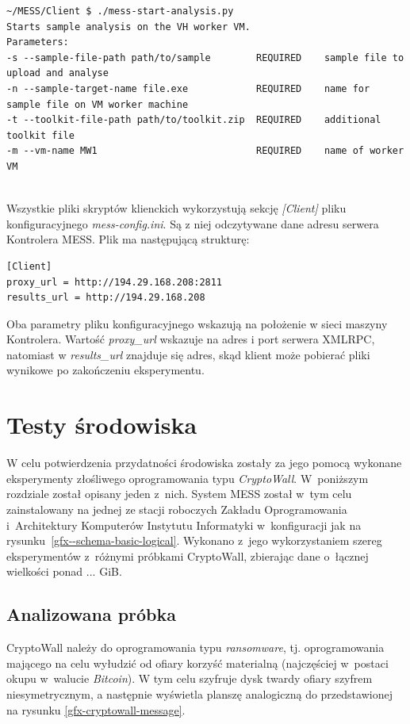 \documentclass[a4paper,12pt,oneside]{article}
\begin{document}
	{\tiny 
	\begin{lstlisting}
~/MESS/Client $ ./mess-start-analysis.py   
Starts sample analysis on the VH worker VM.
Parameters:
-s --sample-file-path path/to/sample        REQUIRED    sample file to upload and analyse
-n --sample-target-name file.exe            REQUIRED    name for sample file on VM worker machine
-t --toolkit-file-path path/to/toolkit.zip  REQUIRED    additional toolkit file
-m --vm-name MW1                            REQUIRED    name of worker VM
		
	\end{lstlisting}
	}
	
	Wszystkie pliki skryptów klienckich wykorzystują sekcję \textit{[Client]} pliku konfiguracyjnego \textit{mess-config.ini}. Są z niej odczytywane dane adresu serwera Kontrolera MESS. Plik ma następującą strukturę:
	
	\begin{lstlisting}
[Client]
proxy_url = http://194.29.168.208:2811
results_url = http://194.29.168.208	
	\end{lstlisting}

	Oba parametry pliku konfiguracyjnego wskazują na położenie w sieci maszyny Kontrolera. Wartość \textit{proxy\_url} wskazuje na adres i port serwera XMLRPC, natomiast w \textit{results\_url} znajduje się adres, skąd klient może pobierać pliki wynikowe po zakończeniu eksperymentu.
	
	\clearpage
	\newpage	
			
	\section{Testy środowiska}
	
	W celu potwierdzenia przydatności środowiska zostały za jego pomocą wykonane eksperymenty złośliwego oprogramowania typu \textit{CryptoWall}. W~poniższym rozdziale został opisany jeden z~nich. System MESS został w~tym celu zainstalowany na jednej ze stacji roboczych Zakładu Oprogramowania i~Architektury Komputerów Instytutu Informatyki w~konfiguracji jak na rysunku~\ref{gfx--schema-basic-logical}. Wykonano z~jego wykorzystaniem szereg eksperymentów z~różnymi próbkami CryptoWall, zbierając dane o~łącznej wielkości ponad ... GiB.
	
	\subsection{Analizowana próbka}
	CryptoWall należy do oprogramowania typu \textit{ransomware}, tj. oprogramowania mającego na celu wyłudzić od ofiary korzyść materialną (najczęściej w~postaci okupu w~walucie \textit{Bitcoin}). W tym celu szyfruje dysk twardy ofiary szyfrem niesymetrycznym, a następnie wyświetla planszę analogiczną do przedstawionej na rysunku \ref{gfx-cryptowall-message}. 
	
\end{document}
